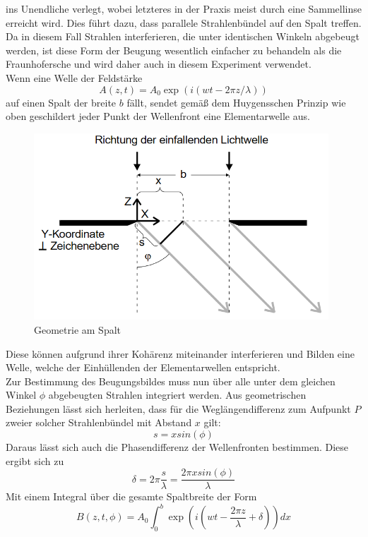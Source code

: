 ins Unendliche verlegt, wobei letzteres in der Praxis meist durch eine Sammellinse erreicht wird. Dies führt dazu, dass parallele Strahlenbündel
auf den Spalt treffen. Da in diesem Fall Strahlen interferieren, die unter identischen Winkeln abgebeugt werden, ist diese Form der Beugung wesentlich 
einfacher zu behandeln als die Fraunhofersche und wird daher auch in diesem Experiment verwendet. \\
Wenn eine Welle der Feldstärke
\begin{equation}
A(z,t)=A_0\exp(i(wt-2\pi z/\lambda))
\end{equation}
auf einen Spalt der breite $b$ fällt, sendet gemäß dem Huygensschen Prinzip wie oben geschildert jeder Punkt der Wellenfront
eine Elementarwelle aus.
\begin{figure} [h]
    \centering
    \includegraphics[height=7cm, keepaspectratio]{Spalt geometrie}
    \caption{Geometrie am Spalt}
 \end{figure}
Diese können aufgrund ihrer Kohärenz miteinander interferieren und Bilden eine Welle, welche der Einhüllenden der Elementarwellen 
entspricht. \\ Zur Bestimmung des Beugungsbildes muss nun über alle unter dem gleichen Winkel $\phi$ abgebeugten Strahlen 
integriert werden. Aus geometrischen Beziehungen lässt sich herleiten, dass für die Weglängendifferenz zum Aufpunkt $P$ zweier solcher Strahlenbündel mit Abstand $x$ gilt:
\begin{equation}
s=xsin(\phi)
\end{equation}
Daraus lässt sich auch die Phasendifferenz der Wellenfronten bestimmen. Diese ergibt sich zu
\begin{equation}
\delta=2\pi\frac{s}{\lambda}=\frac{2\pi xsin(\phi)}{\lambda}
\end{equation}
Mit einem Integral über die gesamte Spaltbreite der Form
\begin{equation}
B(z,t,\phi)=A_0 \int_{0}^{b} \exp(i(wt-\frac{2\pi z}{\lambda}+\delta))dx
\end{equation}
